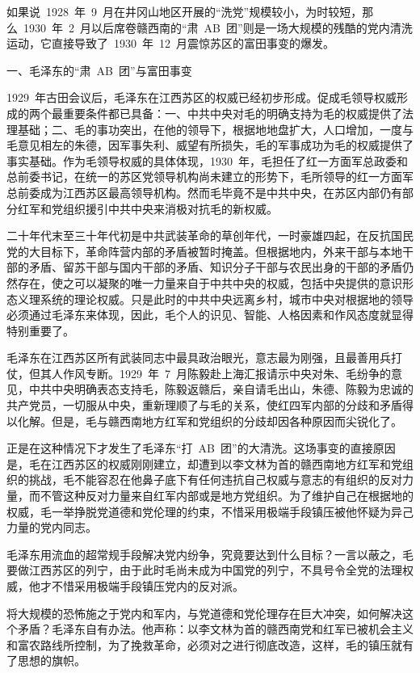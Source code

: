 如果说~1928~年~9~月在井冈山地区开展的“洗党”规模较小，为时较短，那么~1930~年~2~月以后席卷赣西南的“肃~AB~团”则是一场大规模的残酷的党内清洗运动，它直接导致了~1930~年~12~月震惊苏区的富田事变的爆发。

一、毛泽东的“肃~AB~团”与富田事变

1929~年古田会议后，毛泽东在江西苏区的权威已经初步形成。促成毛领导权威形成的两个最重要条件都已具备：一、中共中央对毛的明确支持为毛的权威提供了法理基础；二、毛的事功突出，在他的领导下，根据地地盘扩大，人口增加，一度与毛意见相左的朱德，因军事失利、威望有所损失，毛的军事成功为毛的权威提供了事实基础。作为毛领导权威的具体体现，1930~年，毛担任了红一方面军总政委和总前委书记，在统一的苏区党领导机构尚未建立的形势下，毛所领导的红一方面军总前委成为江西苏区最高领导机构。然而毛毕竟不是中共中央，在苏区内部仍有部分红军和党组织援引中共中央来消极对抗毛的新权威。

二十年代末至三十年代初是中共武装革命的草创年代，一时豪雄四起，在反抗国民党的大目标下，革命阵营内部的矛盾被暂时掩盖。但根据地内，外来干部与本地干部的矛盾、留苏干部与国内干部的矛盾、知识分子干部与农民出身的干部的矛盾仍然存在，使之可以凝聚的唯一力量来自于中共中央的权威，包括中央提供的意识形态义理系统的理论权威。只是此时的中共中央远离乡村，城市中央对根据地的领导必须通过毛泽东来体现，因此，毛个人的识见、智能、人格因素和作风态度就显得特别重要了。

毛泽东在江西苏区所有武装同志中最具政治眼光，意志最为刚强，且最善用兵打仗，但其人作风专断。1929~年~7~月陈毅赴上海汇报请示中央对朱、毛纷争的意见，中共中央明确表态支持毛，陈毅返赣后，亲自请毛出山，朱德、陈毅为忠诚的共产党员，一切服从中央，重新理顺了与毛的关系，使红四军内部的分歧和矛盾得以化解。但是，毛与赣西南地方红军和党组织的分歧却因各种原因而尖锐化了。

正是在这种情况下才发生了毛泽东“打~AB~团”的大清洗。这场事变的直接原因是，毛在江西苏区的权威刚刚建立，却遭到以李文林为首的赣西南地方红军和党组织的挑战，毛不能容忍在他鼻子底下有任何违抗自己权威与意志的有组织的反对力量，而不管这种反对力量来自红军内部或是地方党组织。为了维护自己在根据地的权威，毛一举挣脱党道德和党伦理的约束，不惜采用极端手段镇压被他怀疑为异己力量的党内同志。

毛泽东用流血的超常规手段解决党内纷争，究竟要达到什么目标？一言以蔽之，毛要做江西苏区的列宁，由于此时毛尚未成为中国党的列宁，不具号令全党的法理权威，他才不惜采用极端手段镇压党内的反对派。

将大规模的恐怖施之于党内和军内，与党道德和党伦理存在巨大冲突，如何解决这个矛盾？毛泽东自有办法。他声称：以李文林为首的赣西南党和红军已被机会主义和富农路线所控制，为了挽救革命，必须对之进行彻底改造，这样，毛的镇压就有了思想的旗帜。

